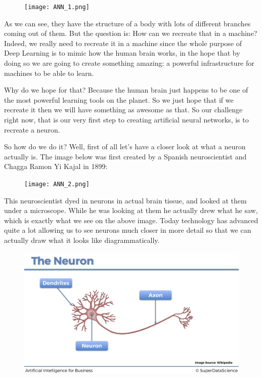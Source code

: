 \documentclass[]{book}
\begin{document}
\begin{figure}[!htbp]
        \begin{center}
            \texttt{[image: ANN\_1.png]}
        \end{center}
\end{figure}

As we can see, they have the structure of a body with lots of different branches coming out of them. But the question is: How can we recreate that in a machine? Indeed, we really need to recreate it in a machine since the whole purpose of Deep Learning is to mimic how the human brain works, in the hope that by doing so we are going to create something amazing: a powerful infrastructure for machines to be able to learn.

Why do we hope for that? Because the human brain just happens to be one of the most powerful learning tools on the planet. So we just hope that if we recreate it then we will have something as awesome as that. So our challenge right now, that is our very first step to creating artificial neural networks, is to recreate a neuron.

So how do we do it? Well, first of all let's have a closer look at what a neuron actually is. The image below was first created by a Spanish neuroscientist and Chagga Ramon Yi Kajal in 1899:

\begin{figure}[!htbp]
        \begin{center}
            \texttt{[image: ANN\_2.png]}
        \end{center}
\end{figure}

This neuroscientist dyed in neurons in actual brain tissue, and looked at them under a microscope. While he was looking at them he actually drew what he saw, which is exactly what we see on the above image. Today technology has advanced quite a lot allowing us to see neurons much closer in more detail so that we can actually draw what it looks like diagrammatically.

\begin{figure}[!htbp]
        \begin{center}
            \includegraphics[scale=0.16]{ANN_3.png}
        \end{center}
\end{figure}
\end{document}
